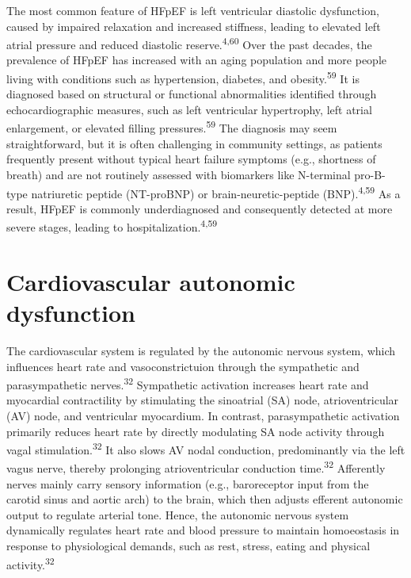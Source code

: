 \documentclass[
  letterpaper,
  headsepline=true,
  open=any]{scrbook}
\begin{document}
The most common feature of HFpEF is left ventricular diastolic
dysfunction, caused by impaired relaxation and increased stiffness,
leading to elevated left atrial pressure and reduced diastolic
reserve.\textsuperscript{4,60} Over the past decades, the prevalence of
HFpEF has increased with an aging population and more people living with
conditions such as hypertension, diabetes, and
obesity.\textsuperscript{59} It is diagnosed based on structural or
functional abnormalities identified through echocardiographic measures,
such as left ventricular hypertrophy, left atrial enlargement, or
elevated filling pressures.\textsuperscript{59} The diagnosis may seem
straightforward, but it is often challenging in community settings, as
patients frequently present without typical heart failure symptoms
(e.g., shortness of breath) and are not routinely assessed with
biomarkers like N-terminal pro-B-type natriuretic peptide (NT-proBNP) or
brain-neuretic-peptide (BNP).\textsuperscript{4,59} As a result, HFpEF
is commonly underdiagnosed and consequently detected at more severe
stages, leading to hospitalization.\textsuperscript{4,59}

\hypertarget{cardiovascular-autonomic-dysfunction}{%
\section{Cardiovascular autonomic
dysfunction}\label{cardiovascular-autonomic-dysfunction}}

The cardiovascular system is regulated by the autonomic nervous system,
which influences heart rate and vasoconstrictuion through the
sympathetic and parasympathetic nerves.\textsuperscript{32} Sympathetic
activation increases heart rate and myocardial contractility by
stimulating the sinoatrial (SA) node, atrioventricular (AV) node, and
ventricular myocardium. In contrast, parasympathetic activation
primarily reduces heart rate by directly modulating SA node activity
through vagal stimulation.\textsuperscript{32} It also slows AV nodal
conduction, predominantly via the left vagus nerve, thereby prolonging
atrioventricular conduction time.\textsuperscript{32} Afferently nerves
mainly carry sensory information (e.g., baroreceptor input from the
carotid sinus and aortic arch) to the brain, which then adjusts efferent
autonomic output to regulate arterial tone. Hence, the autonomic nervous
system dynamically regulates heart rate and blood pressure to maintain
homoeostasis in response to physiological demands, such as rest, stress,
eating and physical activity.\textsuperscript{32}
\end{document}

